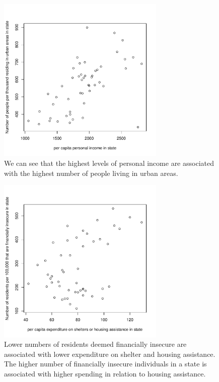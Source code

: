 \documentclass[12pt,letterpaper]{article}
\begin{document}
\begin{figure}[htp]
    \centering
    \includegraphics[width=8cm]{x1 x3 Graph.pdf}
    \caption{We can see that the highest levels of personal income are associated with  the highest number of people living in urban areas.
}
    \label{X1, X3}
\end{figure}

\begin{figure}[htp]
    \centering
    \includegraphics[width=8cm]{Y, X2 Graph.pdf}
    \caption{Lower numbers of residents  deemed financially insecure are associated with lower expenditure on shelter and housing assistance. The higher number of financially insecure individuals in a state is associated with higher spending in relation to housing assistance.
}
    \label{Y, X2}
\end{figure}
\end{document}
